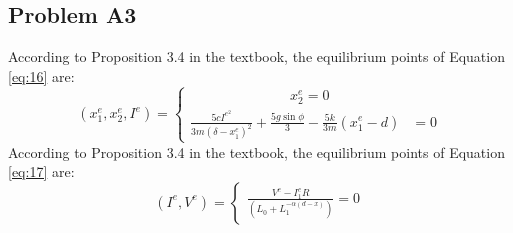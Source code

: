 \subsection*{Problem A3} 
\hfill \break
According to Proposition 3.4 in the textbook, the equilibrium points of Equation \eqref{eq:16} are:
\hfill \break
\begin{equation}
(x_1^e, x_2^e, I^e) = 
    \begin{cases}
        \hspace{3cm}x_2^e = 0\\    
        \frac{5cI^e^2}{3m(\delta - x_1^e)^2} + \frac{5g\sin{\phi}}{3} - \frac{5k}{3m}(x_1^e -d) &= 0   
    \end{cases}
\end{equation}
\hfill \break
According to Proposition 3.4 in the textbook, the equilibrium points of Equation \eqref{eq:17} are:
\hfill \break
\begin{equation}
(I^e, V^e) = 
    \begin{cases}
        \frac{V^e - {I_1^e}R}{\left(L_{0} + L_{1} ^{- \alpha (d - x)}\right)} = 0
    \end{cases}
\end{equation}